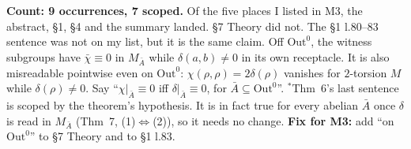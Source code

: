 \documentclass[10pt]{article}
\newcommand{\Out}{\mathrm{Out}}
\newcommand{\Abar}{\bar A}
\begin{document}
\textbf{Count: 9 occurrences, 7 scoped.} Of the five places I listed in M3, the abstract, \S1, \S4 and the summary landed. \S7 Theory did not.
The \S1 l.80--83 sentence was not on my list, but it is the same claim. Off $\Out^0$, the witness subgroups have $\bar\chi\equiv0$ in $M_{\Abar}$ while $\delta(a,b)\neq0$ in its own receptacle.
It is also misreadable pointwise even on $\Out^0$: $\chi(\rho,\rho)=2\delta(\rho)$ vanishes for $2$-torsion $M$ while $\delta(\rho)\ne0$. Say ``$\chi|_{\Abar}\equiv0$ iff $\delta|_{\Abar}\equiv0$, for $\Abar\subseteq\Out^0$''.
$^\ast$Thm~6's last sentence is scoped by the theorem's hypothesis. It is in fact true for every abelian $\Abar$ once $\delta$ is read in $M_{\Abar}$ (Thm~7, (1)$\Leftrightarrow$(2)), so it needs no change.
\textbf{Fix for M3:} add ``on $\Out^0$'' to \S7 Theory and to \S1 l.83.
\end{document}
